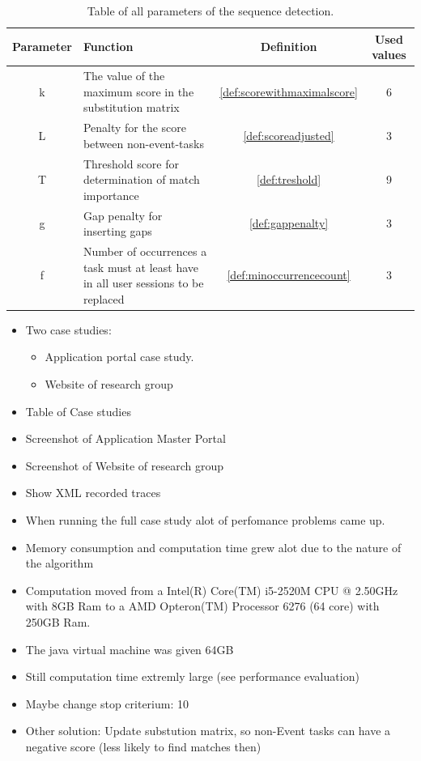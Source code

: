 \begin{table}
	\begin{tabularx}{\textwidth}{|c|X|c|c|}
	   \hline
		   Parameter & Function & Definition & Used values\\
	     \hline
	       k & The value of the maximum score in the substitution matrix& \ref{def:scorewithmaximalscore}& 6 \\
	       L & Penalty for the score between non-event-tasks & \ref{def:scoreadjusted} & 3\\
	       T & Threshold score for determination of match importance & \ref{def:treshold} &9\\
	       g & Gap penalty for inserting gaps & \ref{def:gappenalty} &3\\
	       f & Number of occurrences a task must at least have in all user sessions to be replaced & \ref{def:minoccurrencecount} &3\\
	       \hline
 \end{tabularx}
 \caption{Table of all parameters of the sequence detection.}
 \label{tab:parameters}
 \end{table}


\begin{itemize}
	
	\item Two case studies: 
		\begin{itemize}
			\item Application portal case study. 
			\item Website of research group
		\end{itemize}
	\item Table of Case studies
	\item Screenshot of Application Master Portal
	\item Screenshot of Website of research group
	\item Show XML recorded traces
	\item When running the full case study alot of perfomance problems came up.
	\item Memory consumption and computation time grew alot due to the nature of the algorithm
	\item Computation moved from a Intel(R) Core(TM) i5-2520M CPU @ 2.50GHz with 8GB Ram to a AMD Opteron(TM) Processor 6276 (64 core) with 250GB Ram.
	\item The java virtual machine was given 64GB
	\item Still computation time extremly large (see performance evaluation)
	
	\item Maybe change stop criterium: 10%
	\item Other solution: Update substution matrix, so non-Event tasks can have a negative score (less likely to find matches then)
\end{itemize} 

